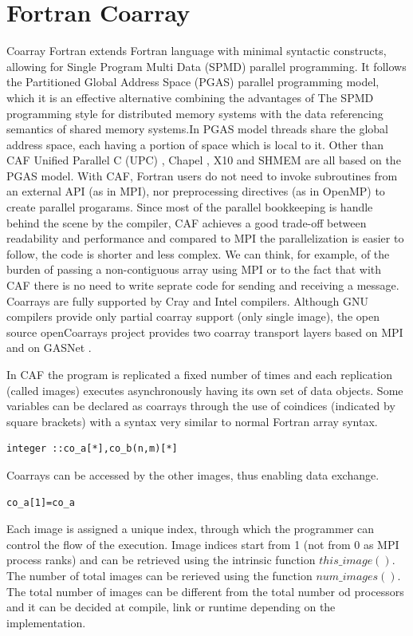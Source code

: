 \documentclass{IOS-Book-Article}
\begin{document}
\section{Fortran Coarray}
Coarray Fortran extends Fortran language with minimal syntactic constructs, allowing for Single Program Multi Data (SPMD) parallel programming. 
It follows the Partitioned Global Address Space (PGAS) parallel programming model, which it is an effective alternative combining the advantages of The SPMD programming style for distributed memory systems with the data referencing semantics of shared memory systems.In PGAS model threads share the global address space, each having a portion of space which is local to it. Other than CAF Unified Parallel C (UPC) \cite{r8}, Chapel \cite{r9}, X10 \cite{r10} and SHMEM are all based on the PGAS model.
With CAF, Fortran users do not need to invoke subroutines from an  external API (as in MPI), nor preprocessing directives (as in OpenMP) to create parallel progarams. 
Since most of the parallel bookkeeping is handle behind the scene by the compiler, CAF achieves a good trade-off between readability and performance and compared to MPI the parallelization is easier to follow, the code is shorter and less complex. We can think, for example, of the burden of passing a non-contiguous array using MPI   or to the fact that with CAF there is no need to write seprate code for sending and receiving a message.
Coarrays are fully supported by Cray and Intel compilers. Although GNU compilers provide only partial coarray support  (only single image),  the open source openCoarrays project provides two coarray transport layers based on MPI and on GASNet \cite{r1}. 

In CAF the program is replicated a fixed number of times and each replication (called images) executes asynchronously having its own set of data objects. 
Some variables can be declared as coarrays through the use of coindices (indicated by square brackets) with a syntax very similar to normal Fortran array syntax. 
\begin{lstlisting}
integer ::co_a[*],co_b(n,m)[*]
\end{lstlisting}

Coarrays can be accessed by the other images, thus enabling data exchange. 

\begin{lstlisting}
co_a[1]=co_a
\end{lstlisting}

Each image is assigned a unique index, through which the programmer can control the flow of the execution. Image indices start from 1 (not from 0 as MPI process ranks) and can be retrieved using the intrinsic function $this\_image()$. The number of total images can be rerieved using the function $num\_images()$. The total number of images can be different from the total number od processors and it can be decided at compile, link or runtime depending on the implementation. 
\end{document}
